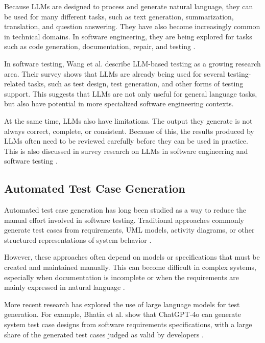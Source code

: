 \documentclass[a4paper,12pt]{article}
\begin{document}
Because LLMs are designed to process and generate natural language, they can be used for many different tasks, such as text generation, summarization, translation, and question answering. They have also become increasingly common in technical domains. In software engineering, they are being explored for tasks such as code generation, documentation, repair, and testing \cite{zhang2026survey}.

In software testing, Wang et al. \cite{wang2024software} describe LLM-based testing as a growing research area. Their survey shows that LLMs are already being used for several testing-related tasks, such as test design, test generation, and other forms of testing support. This suggests that LLMs are not only useful for general language tasks, but also have potential in more specialized software engineering contexts.

At the same time, LLMs also have limitations. The output they generate is not always correct, complete, or consistent. Because of this, the results produced by LLMs often need to be reviewed carefully before they can be used in practice. This is also discussed in survey research on LLMs in software engineering and software testing \cite{zhang2026survey,wang2024software}.

\subsection{Automated Test Case Generation}

Automated test case generation has long been studied as a way to reduce the manual effort involved in software testing. Traditional approaches commonly generate test cases from requirements, UML models, activity diagrams, or other structured representations of system behavior \cite{mustafa2021automated}.

However, these approaches often depend on models or specifications that must be created and maintained manually. This can become difficult in complex systems, especially when documentation is incomplete or when the requirements are mainly expressed in natural language \cite{mustafa2021automated}.

More recent research has explored the use of large language models for test generation. For example, Bhatia et al. show that ChatGPT-4o can generate system test case designs from software requirements specifications, with a large share of the generated test cases judged as valid by developers \cite{bhatia2024system}.
\end{document}
